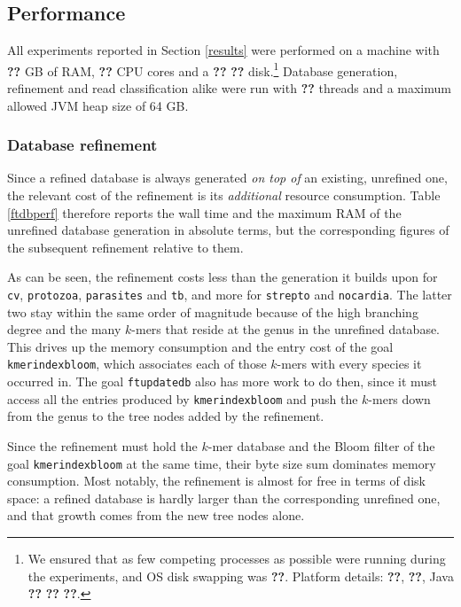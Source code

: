 \documentclass[pdflatex,sn-vancouver-num]{sn-jnl}
\providecommand{\sysUnknown}{\textbf{??}}
\providecommand{\sysCpuModel}{\sysUnknown}
\providecommand{\sysCores}{\sysUnknown}
\providecommand{\sysTotalThreads}{\sysUnknown}
\providecommand{\sysRamGB}{\sysUnknown}
\providecommand{\sysSwap}{\sysUnknown}
\providecommand{\sysDiskSize}{\sysUnknown}
\providecommand{\sysDiskType}{\sysUnknown}
\providecommand{\sysOs}{\sysUnknown}
\providecommand{\sysJavaVendor}{\sysUnknown}
\providecommand{\sysJavaVersion}{\sysUnknown}
\providecommand{\sysJavaVm}{\sysUnknown}
\begin{document}
    \subsection{Performance}\label{performance}

All experiments reported in Section \ref{results} were performed on a machine with \sysRamGB{} GB of RAM, \sysCores{} CPU cores and a \sysDiskSize{} \sysDiskType{} disk.\footnote{We ensured that as few competing processes as possible were running during the experiments, and OS disk swapping was \sysSwap. Platform details: \sysCpuModel, \sysOs, Java \sysJavaVendor{} \sysJavaVersion{} \sysJavaVm.} Database generation, refinement and read classification alike were run with \sysTotalThreads{} threads and a maximum allowed JVM heap size of 64 GB.


    \subsubsection{Database refinement}\label{refinementperformance}

Since a refined database is always generated \emph{on top of} an existing, unrefined one, the relevant cost of the refinement is its \emph{additional} resource consumption. Table \ref{ftdbperf} therefore reports the wall time and the maximum RAM of the unrefined database generation in absolute terms, but the corresponding figures of the subsequent refinement relative to them.

As can be seen, the refinement costs less than the generation it builds upon for \texttt{cv}, \texttt{protozoa}, \texttt{parasites} and \texttt{tb}, and more for \texttt{strepto} and \texttt{nocardia}. The latter two stay within the same order of magnitude because of the high branching degree and the many $k$-mers that reside at the genus in the unrefined database. This drives up the memory consumption and the entry cost of the goal \verb|kmerindexbloom|, which associates each of those $k$-mers with every species it occurred in. The goal \verb|ftupdatedb| also has more work to do then, since it must access all the entries produced by \verb|kmerindexbloom| and push the $k$-mers down from the genus to the tree nodes added by the refinement.

    Since the refinement must hold the $k$-mer database and the Bloom filter of the goal \verb|kmerindexbloom| at the same time, their byte size sum dominates memory consumption.
Most notably, the refinement is almost for free in terms of disk space: a refined database is hardly larger than the corresponding unrefined one, and that growth comes from the new tree nodes alone.
\end{document}
